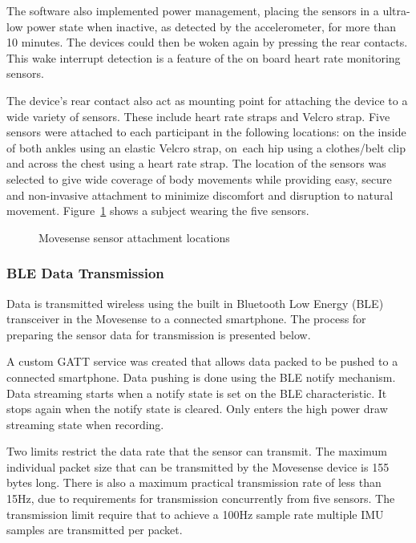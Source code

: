The software also implemented power management, placing the sensors in a ultra-low power state when inactive, as detected by the accelerometer, for more than 10 minutes. The devices could then be woken again by pressing the rear contacts. This wake interrupt detection is a feature of the on board heart rate monitoring sensors.

The device's rear contact also act as mounting point for attaching the device to a wide variety of sensors. These include heart rate straps and Velcro strap. Five sensors were attached to each participant in the following locations: on the inside of both ankles using an elastic Velcro strap, on~each hip using a clothes/belt clip and across the chest using a heart rate strap. The location of the sensors was selected to give wide coverage of body movements while providing easy, secure and non-invasive attachment to minimize discomfort and disruption to natural movement. Figure~\ref{fig:methods-movesense-sensor-locations} shows a subject wearing the five sensors.

\begin{figure}[!hbt]
    \centering
    \caption{Movesense sensor attachment locations}
    \label{fig:methods-movesense-sensor-locations}
\end{figure}

\subsubsection{BLE Data Transmission}
\label{subsection:methods-on-sensor-compression}
Data is transmitted wireless using the built in Bluetooth Low Energy (BLE) transceiver in the Movesense to a connected smartphone. The process for preparing the sensor data for transmission is presented below.

A custom GATT service was created that allows data packed to be pushed to a connected smartphone. Data pushing is done using the BLE notify mechanism. Data streaming starts when a notify state is set on the BLE characteristic. It stops again when the notify state is cleared. Only enters the high power draw streaming state when recording.

Two limits restrict the data rate that the sensor can transmit. The maximum individual packet size that can be transmitted by the Movesense device is 155 bytes long. There is also a maximum practical transmission rate of less than 15Hz, due to requirements for transmission concurrently from five sensors. The transmission limit require that to achieve a 100Hz sample rate multiple IMU samples are transmitted per packet.

